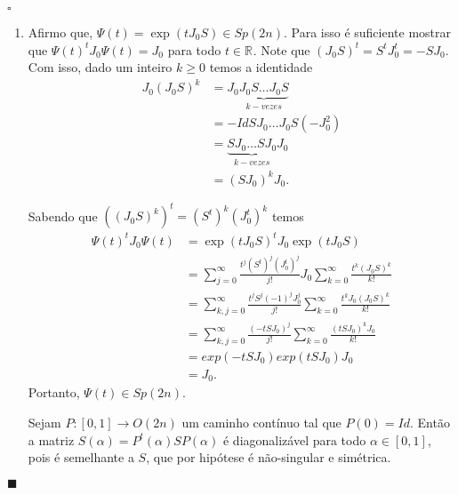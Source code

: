 \documentclass[12pt]{book}
\newenvironment{prova}[1]{$\square$ #1}{\hfill$\blacksquare$}
\newcommand{\estruturacomplexa}{J_{0}}
\newcommand{\gruposimpletico}[1]{Sp(#1)}
\newcommand{\matrizortogonal}[1]{O(#1)}
\newcommand{\real}[1]{\mathbb{R}^{#1}}
\newcommand{\reta}{\real{}}
\begin{document}
\begin{prova}
\begin{enumerate}
			\item Afirmo que, $\Psi(t)=\exp(t\estruturacomplexa S) \in\gruposimpletico{2n}$. Para isso é suficiente mostrar que $\Psi(t)^{t}\estruturacomplexa\Psi(t)= \estruturacomplexa$ para todo $t \in \reta$. Note que $(\estruturacomplexa S)^{t} 
			= S^{t}\estruturacomplexa^{t} = -S\estruturacomplexa$. Com isso, dado um inteiro $k\geq 0$ temos a identidade 
			$$
			\begin{aligned}
			\estruturacomplexa (\estruturacomplexa S)^{k} 
			&= \estruturacomplexa\underbrace{\estruturacomplexa  S\dots \estruturacomplexa S}_{k-vezes} 
			\\
			&= -Id  S\estruturacomplexa \dots \estruturacomplexa S (-\estruturacomplexa^{2}) 
			\\
			&=\underbrace{ S\estruturacomplexa \dots  S \estruturacomplexa }_{k-vezes}\estruturacomplexa 
			\\
			&= (S\estruturacomplexa)^{k}\estruturacomplexa.
			\end{aligned}
			$$
			
			Sabendo que $((\estruturacomplexa S)^{k})^{t} = (S^{t})^{k}(\estruturacomplexa^{t})^{k}$ temos
			$$
			\begin{aligned}
			\Psi(t)^{t}\estruturacomplexa\Psi(t)
			&=
			\exp(t\estruturacomplexa S)^{t}\estruturacomplexa\exp(t\estruturacomplexa S)
			\\
			&=\sum_{j=0}^{\infty}\frac{t^{j}(S^{t})^{j}(\estruturacomplexa^{t})^{j}}{j!}\estruturacomplexa \sum_{k=0}^{\infty}\frac{t^{k}(\estruturacomplexa S)^{k}}{k!}
			\\
			&=\sum_{k,j=0}^{\infty}\frac{t^{j}S^{j}(-1)^{j}\estruturacomplexa^{j}}{j!} \sum_{k=0}^{\infty}\frac{t^{k}\estruturacomplexa(\estruturacomplexa S)^{k}}{k!}
			\\
			&=\sum_{k,j=0}^{\infty}\frac{(-tS\estruturacomplexa)^{j}}{j!} \sum_{k=0}^{\infty}\frac{(tS\estruturacomplexa)^{k}\estruturacomplexa}{k!}
			\\
			&=exp(-tS\estruturacomplexa)exp(tS\estruturacomplexa)\estruturacomplexa
			\\
			&=\estruturacomplexa.
			\end{aligned}
			$$
			Portanto, $\Psi(t) \in \gruposimpletico{2n}$.
			
			Sejam $P:[0,1]\to \matrizortogonal{2n}$ um caminho contínuo tal que $P(0) = Id$. Então a matriz $S(\alpha) = P^{t}(\alpha)SP(\alpha)$ é diagonalizável para todo $\alpha \in [0,1]$, pois é semelhante a $S$, que por hipótese é não-singular e simétrica.
			

\end{enumerate}
\end{prova}
\end{document}
